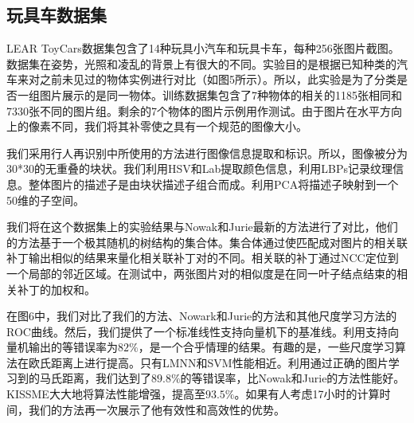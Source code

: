 \subsection{玩具车数据集}
LEAR ToyCars数据集\cite{nowak2007learning}包含了14种玩具小汽车和玩具卡车，每种256张图片截图。数据集在姿势，光照和凌乱的背景上有很大的不同。实验目的是根据已知种类的汽车来对之前未见过的物体实例进行对比（如图5所示）。所以，此实验是为了分类是否一组图片展示的是同一物体。训练数据集包含了7种物体的相关的1185张相同和7330张不同的图片组。剩余的7个物体的图片示例用作测试。由于图片在水平方向上的像素不同，我们将其补零使之具有一个规范的图像大小。

我们采用行人再识别中所使用的方法进行图像信息提取和标识。所以，图像被分为30*30的无重叠的块状。我们利用HSV和Lab提取颜色信息，利用LBPs\cite{ojala2002multiresolution}记录纹理信息。整体图片的描述子是由块状描述子组合而成。利用PCA将描述子映射到一个50维的子空间。

我们将在这个数据集上的实验结果与Nowak和Jurie\cite{nowak2007learning}最新的方法进行了对比，他们的方法基于一个极其随机的树结构的集合体。集合体通过使匹配成对图片的相关联补丁输出相似的结果来量化相关联补丁对的不同。相关联的补丁通过NCC定位到一个局部的邻近区域。在测试中，两张图片对的相似度是在同一叶子结点结束的相关补丁的加权和。

在图6中，我们对比了我们的方法、Nowark和Jurie\cite{nowak2007learning}的方法和其他尺度学习方法的ROC曲线。然后，我们提供了一个标准线性支持向量机下的基准线。利用支持向量机\cite{chang2011libsvm}输出的等错误率为$82\%$，是一个合乎情理的结果。有趣的是，一些尺度学习算法在欧氏距离上进行提高。只有LMNN和SVM性能相近。利用通过正确的图片学习到的马氏距离，我们达到了$89.8\%$的等错误率，比Nowak和Jurie的方法性能好。KISSME大大地将算法性能增强，提高至$93.5\%$。如果有人考虑17小时的计算时间\cite{nowak2007learning}，我们的方法再一次展示了他有效性和高效性的优势。

